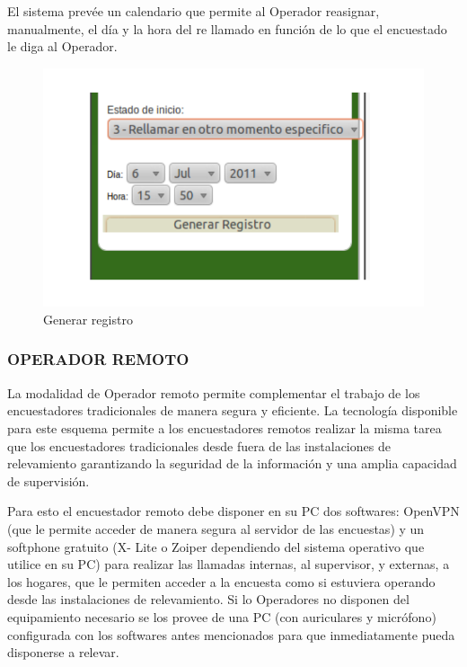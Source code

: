 \documentclass[
  openany]{book}
\begin{document}
El sistema prevée un calendario que permite al Operador reasignar, manualmente, el día y la hora del re llamado en función de lo que el encuestado le diga al Operador.

\begin{figure}

{\centering \includegraphics[width=1\linewidth]{imagenes/figura6-19} 

}

\caption{Generar registro}\label{fig:Gen}
\end{figure}

\hypertarget{operador-remoto}{%
\subsubsection{\texorpdfstring{\textbf{OPERADOR REMOTO}}{OPERADOR REMOTO}}\label{operador-remoto}}

La modalidad de Operador remoto permite complementar el trabajo de los encuestadores tradicionales de manera segura y eficiente. La tecnología disponible para este esquema permite a los encuestadores remotos realizar la misma tarea que los encuestadores tradicionales desde fuera de las instalaciones de relevamiento garantizando la seguridad de la información y una amplia capacidad de supervisión.

Para esto el encuestador remoto debe disponer en su PC dos softwares: OpenVPN (que le permite acceder de manera segura al servidor de las encuestas) y un softphone gratuito (X- Lite o Zoiper dependiendo del sistema operativo que utilice en su PC) para realizar las llamadas internas, al supervisor, y externas, a los hogares, que le permiten acceder a la encuesta como si estuviera operando desde las instalaciones de relevamiento. Si lo Operadores no disponen del equipamiento necesario se los provee de una PC (con auriculares y micrófono) configurada con los softwares antes mencionados para que inmediatamente pueda disponerse a relevar.
\end{document}
